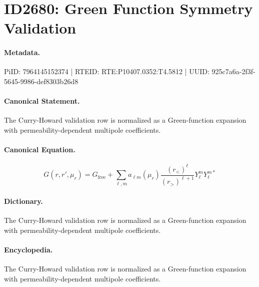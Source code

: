 \section*{ID2680: Green Function Symmetry Validation}
\paragraph{Metadata.}
PiID: 7964145152374 | RTEID: RTE:P10407.0352:T4.5812 | UUID: 925c7a6a-2f3f-5645-9986-def8303b26d8

\paragraph{Canonical Statement.}
The Curry-Howard validation row is normalized as a Green-function expansion with permeability-dependent multipole coefficients.

\paragraph{Canonical Equation.}
\[
G(r,r',\mu_r)=G_{\mathrm{free}}+\sum_{\ell,m}a_{\ell m}(\mu_r)\frac{(r_<)^{\ell}}{(r_>)^{\ell+1}}Y_{\ell}^{m}Y_{\ell}^{m*}
\]

\paragraph{Dictionary.}
The Curry-Howard validation row is normalized as a Green-function expansion with permeability-dependent multipole coefficients.

\paragraph{Encyclopedia.}
The Curry-Howard validation row is normalized as a Green-function expansion with permeability-dependent multipole coefficients.
